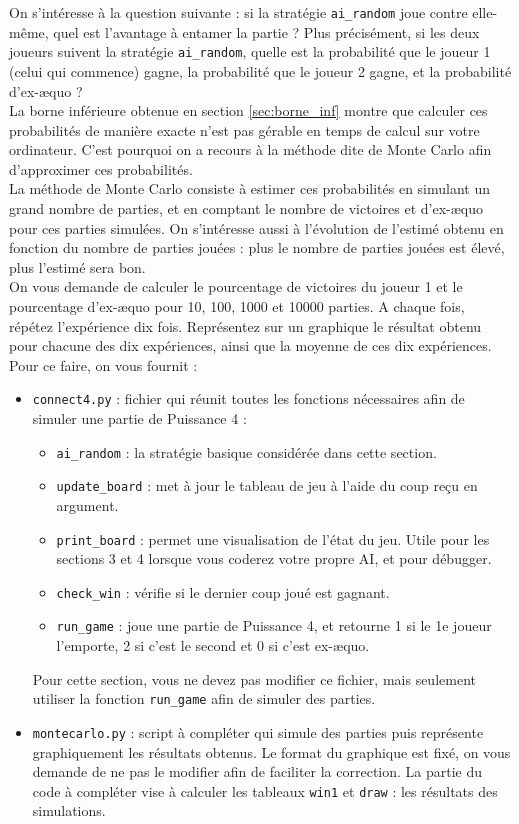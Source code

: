 \documentclass[11pt,answers]{exam}
\begin{document}
On s'intéresse à la question suivante : si la stratégie \texttt{ai\_random} joue contre elle-même, quel est l'avantage à entamer la partie ? Plus précisément, si les deux joueurs suivent la stratégie \texttt{ai\_random}, quelle est la probabilité que le joueur 1 (celui qui commence) gagne, la probabilité que le joueur 2 gagne, et la probabilité d'ex-æquo ?\\

La borne inférieure obtenue en section \ref{sec:borne_inf} montre que calculer ces probabilités de manière exacte n'est pas gérable en temps de calcul sur votre ordinateur. C'est pourquoi on a recours à la méthode dite de Monte Carlo afin d'approximer ces probabilités.\\

La méthode de Monte Carlo consiste à estimer ces probabilités en simulant un grand nombre de parties, et en comptant le nombre de victoires et d'ex-æquo pour ces parties simulées. On s'intéresse aussi à l'évolution de l'estimé obtenu en fonction du nombre de parties jouées : plus le nombre de parties jouées est élevé, plus l'estimé sera bon.\\

On vous demande de calculer le pourcentage de victoires du joueur 1 et le pourcentage d'ex-æquo pour 10, 100, 1000 et 10000 parties. A chaque fois, répétez l'expérience dix fois. Représentez sur un graphique le résultat obtenu pour chacune des dix expériences, ainsi que la moyenne de ces dix expériences. Pour ce faire, on vous fournit :

\begin{itemize}
	\item \texttt{connect4.py} : fichier qui réunit toutes les fonctions nécessaires afin de simuler une partie de Puissance 4 :
	      \begin{itemize}
		      \item \texttt{ai\_random} : la stratégie basique considérée dans cette section.
		      \item \texttt{update\_board} : met à jour le tableau de jeu à l'aide du coup reçu en argument.
		      \item \texttt{print\_board} : permet une visualisation de l'état du jeu. Utile pour les sections 3 et 4 lorsque vous coderez votre propre AI, et pour débugger.
		      \item \texttt{check\_win} : vérifie si le dernier coup joué est gagnant.
		      \item \texttt{run\_game} : joue une partie de Puissance 4, et retourne 1 si le 1e joueur l'emporte, 2 si c'est le second et 0 si c'est ex-æquo.
	      \end{itemize}
	      Pour cette section, vous ne devez pas modifier ce fichier, mais seulement utiliser la fonction \texttt{run\_game} afin de simuler des parties.
	\item \texttt{montecarlo.py} : script à compléter qui simule des parties puis représente graphiquement les résultats obtenus. Le format du graphique est fixé, on vous demande de ne pas le modifier afin de faciliter la correction. La partie du code à compléter vise à calculer les tableaux \texttt{win1} et \texttt{draw} : les résultats des simulations.
\end{itemize}
\end{document}
